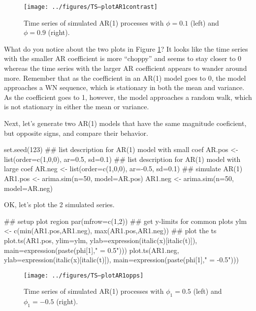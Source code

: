 \begin{figure}[htp]
\begin{center}
\texttt{[image: ../figures/TS--plotAR1contrast]}
\end{center}
\caption{Time series of simulated AR(1) processes with $\phi=0.1$ (left) and $\phi=0.9$ (right).}
\label{fig:LW1.AR1comp}
\end{figure}

What do you notice about the two plots in Figure \ref{fig:LW1.AR1comp}?  It looks like the time series with the smaller AR coefficient is more ``choppy'' and seems to stay closer to 0 whereas the time series with the larger AR coefficient appears to wander around more.  Remember that as the coefficient in an AR(1) model goes to 0, the model approaches a WN sequence, which is stationary in both the mean and variance.  As the coefficient goes to 1, however, the model approaches a random walk, which is not stationary in either the mean or variance.

Next, let's generate two AR(1) models that have the same magnitude coeficient, but opposite signs, and compare their behavior.

\begin{Schunk}
\begin{Sinput}
 set.seed(123)
 ## list description for AR(1) model with small coef
 AR.pos <- list(order=c(1,0,0), ar=0.5, sd=0.1)
 ## list description for AR(1) model with large coef
 AR.neg <- list(order=c(1,0,0), ar=-0.5, sd=0.1)
 ## simulate AR(1)
 AR1.pos <- arima.sim(n=50, model=AR.pos)
 AR1.neg <- arima.sim(n=50, model=AR.neg)
\end{Sinput}
\end{Schunk}

\noindent OK, let's plot the 2 simulated series.

\begin{Schunk}
\begin{Sinput}
 ## setup plot region
 par(mfrow=c(1,2))
 ## get y-limits for common plots
 ylm <- c(min(AR1.pos,AR1.neg), max(AR1.pos,AR1.neg))
 ## plot the ts
 plot.ts(AR1.pos, ylim=ylm,
         ylab=expression(italic(x)[italic(t)]),
         main=expression(paste(phi[1]," = 0.5")))
 plot.ts(AR1.neg,
         ylab=expression(italic(x)[italic(t)]),
         main=expression(paste(phi[1]," = -0.5")))
\end{Sinput}
\end{Schunk}


\begin{figure}[htp]
\begin{center}
\texttt{[image: ../figures/TS--plotAR1opps]}
\end{center}
\caption{Time series of simulated AR(1) processes with $\phi_1=0.5$ (left) and $\phi_1=-0.5$ (right).}
\label{fig:LW1.AR1comp2b}
\end{figure}

